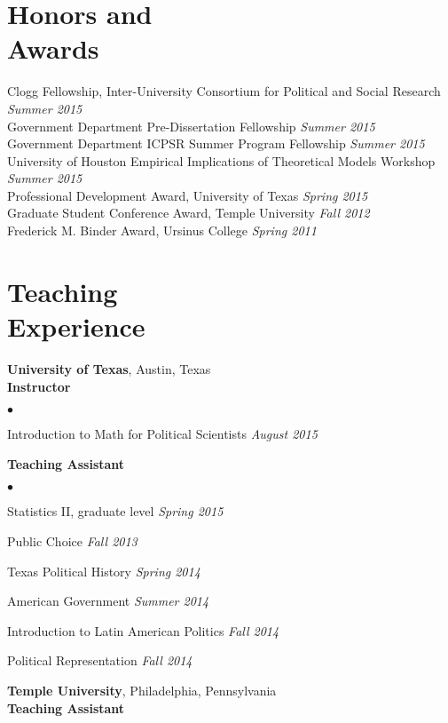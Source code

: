 \documentclass[margin,line]{res}
\newenvironment{list2}{
    \begin{list}{$\bullet$}{%
        \setlength{\itemsep}{0in}
        \setlength{\parsep}{0in} \setlength{\parskip}{0in}
        \setlength{\topsep}{0in} \setlength{\partopsep}{0in}
        \setlength{\leftmargin}{0.2in}}}{\end{list}}
\begin{document}
\begin{resume}
\section{\sc Honors and \\Awards}
Clogg Fellowship, Inter-University Consortium for Political and Social Research \hfill {\em Summer 2015} \\
Government Department Pre-Dissertation Fellowship   \hfill {\em Summer 2015} \\
Government Department ICPSR Summer Program Fellowship     \hfill    {\em Summer 2015} \\
University of Houston Empirical Implications of Theoretical Models Workshop  \hfill    {\em Summer 2015} \\
Professional Development Award, University of Texas \hfill    {\em Spring 2015} \\
Graduate Student Conference Award, Temple University \hfill    {\em Fall 2012} \\
Frederick M. Binder Award, Ursinus College \hfill    {\em Spring 2011} %

\section{\sc Teaching \\Experience}
{\bf University of Texas}, Austin, Texas  \\
{\bf Instructor}
\begin{list2}
	\item Introduction to Math for Political Scientists \hfill {\em August 2015}
\end{list2}
{\bf Teaching Assistant} 

\begin{list2}
	\item Statistics II, graduate level \hfill {\em Spring 2015}
    \item Public Choice \hfill {\em Fall 2013}
    \item Texas Political History \hfill {\em Spring 2014}
    \item American Government \hfill {\em Summer 2014}
    \item Introduction to Latin American Politics \hfill {\em Fall 2014}
    \item Political Representation \hfill {\em Fall 2014}
\end{list2}

{\bf Temple University}, Philadelphia, Pennsylvania  \\
{\bf Teaching Assistant}


\end{resume}
\end{document}
